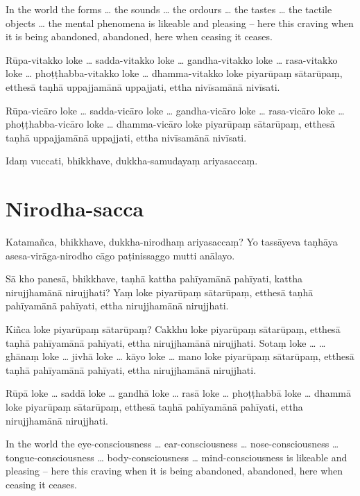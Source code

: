 In the world the forms \ldots{} the sounds \ldots{} the ordours \ldots{} the
tastes \ldots{} the tactile objects \ldots{} the mental phenomena is likeable
and pleasing -- here this craving when it is being abandoned, abandoned, here
when ceasing it ceases.

\paliPage

Rūpa-vitakko loke \ldots{} sadda-vitakko loke \ldots{} gandha-vitakko loke \ldots{}
rasa-vitakko loke \ldots{} phoṭṭhabba-vitakko loke \ldots{} dhamma-vitakko loke
piyarūpaṃ sātarūpaṃ, etthesā taṇhā uppajjamānā uppajjati, ettha nivīsamānā
nivīsati.

Rūpa-vicāro loke \ldots{} sadda-vicāro loke \ldots{} gandha-vicāro loke \ldots{}
rasa-vicāro loke \ldots{} phoṭṭhabba-vicāro loke \ldots{} dhamma-vicāro loke
piyarūpaṃ sātarūpaṃ, etthesā taṇhā uppajjamānā uppajjati, ettha nivīsamānā
nivīsati.

Idaṃ vuccati, bhikkhave, dukkha-samudayaṃ ariyasaccaṃ.

\section*{Nirodha-sacca}

Katamañca, bhikkhave, dukkha-nirodhaṃ ariyasaccaṃ? Yo tassāyeva taṇhāya
asesa-virāga-nirodho cāgo paṭinissaggo mutti anālayo.

Sā kho panesā, bhikkhave, taṇhā kattha pahīyamānā pahīyati, kattha nirujjhamānā
nirujjhati? Yaṃ loke piyarūpaṃ sātarūpaṃ, etthesā taṇhā pahīyamānā pahīyati,
ettha nirujjhamānā nirujjhati.

Kiñca loke piyarūpaṃ sātarūpaṃ? Cakkhu loke piyarūpaṃ sātarūpaṃ, etthesā taṇhā
pahīyamānā pahīyati, ettha nirujjhamānā nirujjhati. Sotaṃ loke \ldots{}
\ldots{} ghānaṃ loke \ldots{} jivhā loke \ldots{} kāyo loke \ldots{} mano loke
piyarūpaṃ sātarūpaṃ, etthesā taṇhā pahīyamānā pahīyati, ettha nirujjhamānā
nirujjhati.

Rūpā loke \ldots{} saddā loke \ldots{} gandhā loke \ldots{} rasā loke \ldots{}
phoṭṭhabbā loke \ldots{} dhammā loke piyarūpaṃ sātarūpaṃ, etthesā taṇhā
pahīyamānā pahīyati, ettha nirujjhamānā nirujjhati.

\englishPage

In the world the eye-consciousness \ldots{} ear-consciousness \ldots{}
nose-consciousness \ldots{} tongue-consciousness \ldots{} body-consciousness
\ldots{} mind-consciousness is likeable and pleasing -- here this craving when
it is being abandoned, abandoned, here when ceasing it ceases.

